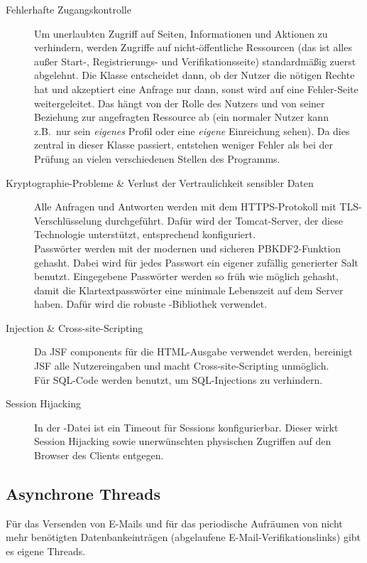 \begin{description}
\item[Fehlerhafte Zugangskontrolle] 
Um unerlaubten Zugriff auf Seiten, Informationen und Aktionen zu verhindern, werden Zugriffe auf nicht-öffentliche Ressourcen (das ist alles außer Start-, Registrierungs- und Verifikationsseite) standardmäßig zuerst abgelehnt.
Die Klasse  entscheidet dann, ob der Nutzer die nötigen Rechte hat und akzeptiert eine Anfrage nur dann, sonst wird auf eine Fehler-Seite weitergeleitet.
Das hängt von der Rolle des Nutzers und von seiner Beziehung zur angefragten Ressource ab (ein normaler Nutzer kann z.B.\ nur sein \emph{eigenes} Profil oder eine \emph{eigene} Einreichung sehen).
Da dies zentral in dieser Klasse passiert, entstehen weniger Fehler als bei der Prüfung an vielen verschiedenen Stellen des Programms.

\item[Kryptographie-Probleme \& Verlust der Vertraulichkeit sensibler Daten]
Alle Anfragen und Antworten werden mit dem HTTPS-Protokoll mit TLS-Verschlüsselung durchgeführt.
Dafür wird der Tomcat-Server, der diese Technologie unterstützt, entsprechend konfiguriert.
\\
Passwörter werden mit der modernen und sicheren PBKDF2-Funktion gehasht. Dabei wird für jedes Passwort ein eigener zufällig generierter Salt benutzt. Eingegebene Passwörter werden so früh wie möglich gehasht, damit die Klartextpasswörter eine minimale Lebenszeit auf dem Server haben.  Dafür wird die robuste -Bibliothek verwendet. 

\item[Injection \& Cross-site-Scripting]
Da JSF components für die HTML-Ausgabe verwendet werden, bereinigt JSF alle Nutzereingaben und macht Cross-site-Scripting unmöglich.
\\
Für SQL-Code werden  benutzt, um SQL-Injections zu verhindern.

\item[Session Hijacking]
In der -Datei ist ein Timeout für Sessions konfigurierbar.
Dieser wirkt Session Hijacking sowie unerwünschten physischen Zugriffen auf den Browser des Clients entgegen.

\end{description}

\subsection{Asynchrone Threads}\label{subsec:threads}
Für das Versenden von E-Mails und für das periodische Aufräumen von nicht mehr benötigten Datenbankeinträgen (abgelaufene E-Mail-Verifikationslinks) gibt es eigene Threads.

